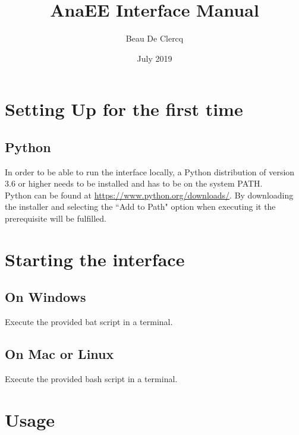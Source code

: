 \documentclass[12pt]{article}
\title{AnaEE Interface Manual}
\author{Beau De Clercq}
\date{July 2019}
\begin{document}
\maketitle{}

\tableofcontents

\clearpage
\newpage

\section{Setting Up for the first time}
\subsection{Python}
In order to be able to run the interface locally, a Python distribution of version 3.6 or higher needs to be installed and has to be on the system PATH.\\
Python can be found at \url{https://www.python.org/downloads/}. By downloading the installer and selecting the ``Add to Path" option when executing it the prerequisite will be fulfilled.

\section{Starting the interface}
\subsection{On Windows}
Execute the provided bat script in a terminal.
\subsection{On Mac or Linux}
Execute the provided bash script in a terminal.
\newpage

\section{Usage}
\end{document}
